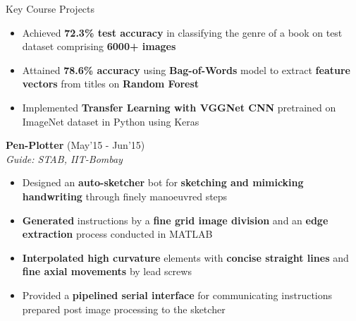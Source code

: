 \documentclass{resume}
\newcommand{\sepval}{-0.5em}
\begin{document}
\begin{rSection}{Key Course Projects}
\begin{itemize}[leftmargin=*]

	\itemsep \sepval

	\item Achieved {\bf 72.3\% test accuracy} in classifying the genre of a book on test dataset comprising {\bf 6000+ images}

	\item Attained {\bf 78.6\% accuracy} using {\bf Bag-of-Words} model to extract {\bf feature vectors} from titles on {\bf Random Forest}

	\item Implemented {\bf Transfer Learning with VGGNet CNN} pretrained on ImageNet dataset in Python using Keras
\end{itemize}

\item {\bf Pen-Plotter} \hfill{(May'15 - Jun'15)} \\

\emph{Guide: STAB, IIT-Bombay}\\
[-0.6cm]

 \begin{itemize}[leftmargin=*]

	\itemsep \sepval
 	
  	\item Designed an {\bf auto-sketcher} bot for {\bf sketching and mimicking handwriting} 
	      through finely manoeuvred steps
 	
	\item {\bf Generated} instructions by a {\bf fine grid image division} and an {\bf edge extraction} 
	      process conducted in MATLAB 

	\item {\bf Interpolated high curvature} elements with {\bf concise straight lines} and {\bf fine axial movements} by lead screws

	\item Provided a {\bf pipelined  serial interface} for communicating instructions prepared post image processing to the sketcher

 \end{itemize}


\end{rSection}

\end{document}
